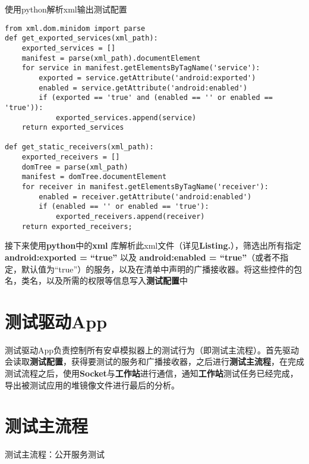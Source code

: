 \begin{listing}[htbp]
	\centering
	\caption{使用python解析xml输出测试配置}
	\begin{verbatim}
from xml.dom.minidom import parse
def get_exported_services(xml_path):
	exported_services = []
	manifest = parse(xml_path).documentElement 
	for service in manifest.getElementsByTagName('service'):
		exported = service.getAttribute('android:exported')
		enabled = service.getAttribute('android:enabled')
		if (exported == 'true' and (enabled == '' or enabled == 'true')):
			exported_services.append(service)
	return exported_services
	
def get_static_receivers(xml_path):
	exported_receivers = []
	domTree = parse(xml_path)
	manifest = domTree.documentElement
	for receiver in manifest.getElementsByTagName('receiver'):
		enabled = receiver.getAttribute('android:enabled')
		if (enabled == '' or enabled == 'true'):
			exported_receivers.append(receiver)
	return exported_receivers;
	\end{verbatim}
	\label{python:get services}	
\end{listing}

接下来使用\textbf{python}中的\textbf{xml} 库解析此xml文件（详见\textbf{Listing.}\redbf{\ref{python:get services}}），筛选出所有指定\textbf{android:exported = “true”} 以及 \textbf{android:enabled = “true”}（或者不指定，默认值为“true”）的服务，以及在清单中声明的广播接收器。将这些控件的包名，类名，以及所需的权限等信息写入\textbf{测试配置}中
\section{测试驱动App}\label{test driver app}
测试驱动App负责控制所有安卓模拟器上的测试行为（即测试主流程\redbf{\ref{main flow}}）。首先驱动会读取\textbf{测试配置}，获得要测试的服务和广播接收器，之后进行\textbf{测试主流程}，在完成测试流程之后，使用\textbf{Socket}与\textbf{工作站}进行通信，通知\textbf{工作站}测试任务已经完成，导出被测试应用的堆镜像文件进行最后的分析。
\section{测试主流程}\label{main flow}

\begin{algorithm}
	\caption{测试主流程：公开服务测试}
	\label{alg:service}
	\begin{algorithmic}[1]
			\ENDIF
				\ELSE
				\ENDIF
			\ENDWHILE
			\ENDIF
		\ENDFOR
	\end{algorithmic}
\end{algorithm}

